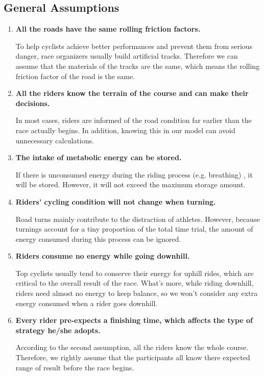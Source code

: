 \documentclass{article}
\begin{document}
		\subsection{General Assumptions}
		\begin{enumerate}
			\item  \textbf{All the roads have the same rolling friction factors.}

					To help cyclists achieve better performances and prevent them from serious danger, race organizers usually build artificial tracks. Therefore we can assume that the materials of the tracks are the same, which means the rolling friction factor of the road is the same.
			\item  \textbf{All the riders know the terrain of the course and can make their decisions.}

					In most cases, riders are informed of the road condition far earlier than the race actually begins. In addition, knowing this in our model can avoid unnecessary calculations.
			\item  \textbf{The intake of metabolic energy can be stored.}

					If there is unconsumed energy during the riding process (e.g. breathing) , it will be stored. However, it will not exceed the maximum storage amount.
			\item  \textbf{Riders' cycling condition will not change when turning.}

					Road turns mainly contribute to the distraction of athletes. However, because turnings account for a tiny proportion of the total time trial, the amount of energy consumed during this process can be ignored.
			\item \textbf{Riders consume no energy while going downhill.}

					Top cyclists usually tend to conserve their energy for uphill rides, which are critical to the overall result of the race. What's more, while riding downhill, riders need almost no energy to keep balance, so we won't consider any extra energy consumed when a rider goes downhill.
			\item \textbf{Every rider pre-expects a finishing time, which affects the type of strategy he/she adopts.}

					According to the second assumption, all the riders know the whole course. Therefore, we rightly assume that the participants all know there expected range of result before the race begins.

		\end{enumerate}
\end{document}
